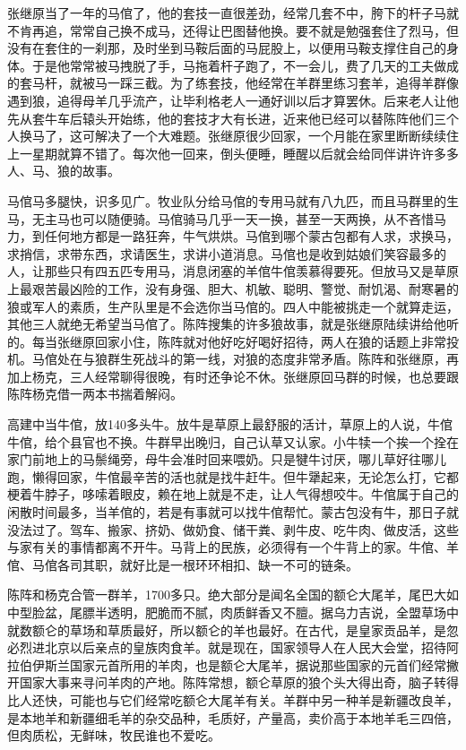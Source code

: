 \par 张继原当了一年的马倌了，他的套技一直很差劲，经常几套不中，胯下的杆子马就不肯再追，常常自己换不成马，还得让巴图替他换。要不就是勉强套住了烈马，但没有在套住的一刹那，及时坐到马鞍后面的马屁股上，以便用马鞍支撑住自己的身体。于是他常常被马拽脱了手，马拖着杆子跑了，不一会儿，费了几天的工夫做成的套马杆，就被马一踩三截。为了练套技，他经常在羊群里练习套羊，追得羊群像遇到狼，追得母羊几乎流产，让毕利格老人一通好训以后才算罢休。后来老人让他先从套牛车后辕头开始练，他的套技才大有长进，近来他已经可以替陈阵他们三个人换马了，这可解决了一个大难题。张继原很少回家，一个月能在家里断断续续住上一星期就算不错了。每次他一回来，倒头便睡，睡醒以后就会给同伴讲许许多多人、马、狼的故事。
\par 马倌马多腿快，识多见广。牧业队分给马倌的专用马就有八九匹，而且马群里的生马，无主马也可以随便骑。马倌骑马几乎一天一换，甚至一天两换，从不吝惜马力，到任何地方都是一路狂奔，牛气烘烘。马倌到哪个蒙古包都有人求，求换马，求捎信，求带东西，求请医生，求讲小道消息。马倌也是收到姑娘们笑容最多的人，让那些只有四五匹专用马，消息闭塞的羊倌牛倌羡慕得要死。但放马又是草原上最艰苦最凶险的工作，没有身强、胆大、机敏、聪明、警觉、耐饥渴、耐寒暑的狼或军人的素质，生产队里是不会选你当马倌的。四人中能被挑走一个就算走运，其他三人就绝无希望当马倌了。陈阵搜集的许多狼故事，就是张继原陆续讲给他听的。每当张继原回家小住，陈阵就对他好吃好喝好招待，两人在狼的话题上非常投机。马倌处在与狼群生死战斗的第一线，对狼的态度非常矛盾。陈阵和张继原，再加上杨克，三人经常聊得很晚，有时还争论不休。张继原回马群的时候，也总要跟陈阵杨克借一两本书揣着解闷。
\par 高建中当牛倌，放140多头牛。放牛是草原上最舒服的活计，草原上的人说，牛倌牛倌，给个县官也不换。牛群早出晚归，自己认草又认家。小牛犊一个挨一个拴在家门前地上的马鬃绳旁，母牛会准时回来喂奶。只是犍牛讨厌，哪儿草好往哪儿跑，懒得回家，牛倌最辛苦的活也就是找牛赶牛。但牛犟起来，无论怎么打，它都梗着牛脖子，哆嗦着眼皮，赖在地上就是不走，让人气得想咬牛。牛倌属于自己的闲散时间最多，当羊倌的，若是有事就可以找牛倌帮忙。蒙古包没有牛，那日子就没法过了。驾车、搬家、挤奶、做奶食、储干粪、剥牛皮、吃牛肉、做皮活，这些与家有关的事情都离不开牛。马背上的民族，必须得有一个牛背上的家。牛倌、羊倌、马倌各司其职，就好比是一根环环相扣、缺一不可的链条。
\par 陈阵和杨克合管一群羊，1700多只。绝大部分是闻名全国的额仑大尾羊，尾巴大如中型脸盆，尾膘半透明，肥脆而不腻，肉质鲜香又不膻。据乌力吉说，全盟草场中就数额仑的草场和草质最好，所以额仑的羊也最好。在古代，是皇家贡品羊，是忽必烈进北京以后亲点的皇族肉食羊。就是现在，国家领导人在人民大会堂，招待阿拉伯伊斯兰国家元首所用的羊肉，也是额仑大尾羊，据说那些国家的元首们经常撇开国家大事来寻问羊肉的产地。陈阵常想，额仑草原的狼个头大得出奇，脑子转得比人还快，可能也与它们经常吃额仑大尾羊有关。羊群中另一种羊是新疆改良羊，是本地羊和新疆细毛羊的杂交品种，毛质好，产量高，卖价高于本地羊毛三四倍，但肉质松，无鲜味，牧民谁也不爱吃。
